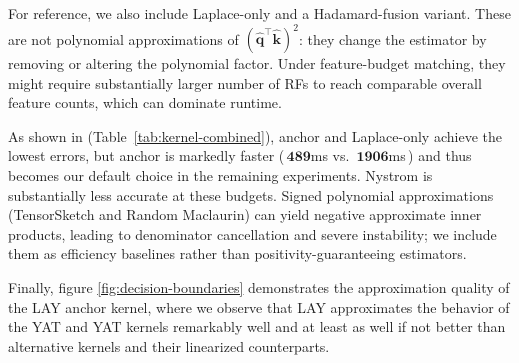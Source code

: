 \documentclass{article}
\begin{document}
For reference, we also include Laplace-only and a Hadamard-fusion variant. These are not polynomial approximations of $(\widehat{\mathbf{q}}^\top \widehat{\mathbf{k}})^2$: they change the estimator by removing or altering the polynomial factor. Under feature-budget matching, they might require substantially larger number of RFs to reach comparable overall feature counts, which can dominate runtime.
\begin{table}[htbp]
\centering
\small
\caption{\small{Kernel approximation quality and latency comparison. Rel.~$\ell_2$ is relative L2 error, Cos is cosine similarity, MSE is mean squared error, and Latency is forward-pass time in milliseconds. For large-scale snapshot, see the ``Large'' block in Table~\ref{tab:poly-sweep}).}}
\label{tab:kernel-combined}
\end{table}

As shown in (Table~\ref{tab:kernel-combined}), anchor and Laplace-only achieve the lowest errors, but anchor is markedly faster (\,$\mathbf{489}$ms vs.~$\mathbf{1906}$ms\,) and thus becomes our default choice in the remaining experiments. Nystrom is substantially less accurate at these budgets. Signed polynomial approximations (TensorSketch and Random Maclaurin) can yield negative approximate inner products, leading to denominator cancellation and severe instability; we include them as efficiency baselines rather than positivity-guaranteeing estimators.

Finally, figure \ref{fig:decision-boundaries} demonstrates the approximation quality of the LAY anchor kernel, where we observe that LAY approximates the behavior of the YAT and YAT kernels remarkably well and at least as well if not better than alternative kernels and their linearized counterparts.
\end{document}
